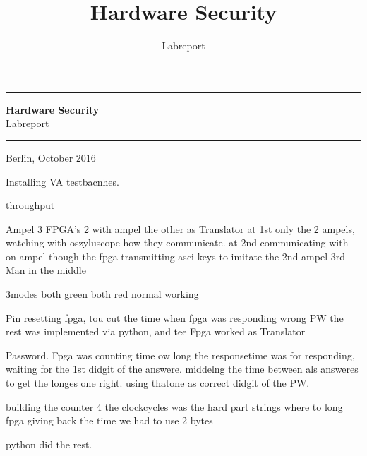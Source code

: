 \documentclass[a4paper, ngerman, 12pt]{scrartcl}
\title{Hardware Security}
\subtitle{Labreport}
\date{}
\begin{document}
    \begin{titlepage}
        \begin{figure*}
            \begin{flushright}
            \end{flushright}
        \end{figure*}
        \vspace*{-1cm}
        \hrule
        \vspace{.2cm}
        \begin{center}
            \vfill
            \textsf{\textbf{\Huge{Hardware Security}}}\\[1.5em]
            \textsf{\LARGE{Labreport}}
            \vfill
        \end{center}
        \vfill
        \hrule
        \vspace{.2cm}
        \large{Berlin, October 2016}
    \end{titlepage}
    
    \setcounter{page}{1}
    
    
    
    Installing VA testbacnhes.
    
    
    
    
    throughput
    
    

Ampel
3 FPGA's 2 with ampel the other as Translator 
at 1st only the 2 ampels, watching with oszyluscope how they communicate.
at 2nd communicating with on ampel though the fpga transmitting asci keys to imitate the 2nd ampel
3rd Man in the middle 

3modes both green
both red
normal working

    

Pin 
resetting fpga, tou cut the time when fpga was responding wrong PW
the rest was implemented via python, and tee Fpga worked as Translator

    

Password. Fpga was counting time ow long the responsetime was for responding, waiting for the 1st didgit of the answere. middelng the time between als answeres to get the longes one right. using thatone as correct didgit of the PW.

building the counter 4 the clockcycles was the hard part strings where to long
fpga giving back the time  we had to use 2 bytes
 
python did the rest.

    
\end{document}
